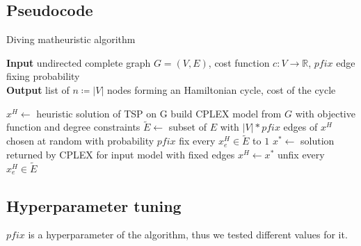 \subsection{Pseudocode}
\begin{algorithm}[h]
    \caption{Diving matheuristic algorithm}
    \hspace*{\algorithmicindent} \textbf{Input} undirected complete graph $G=(V,E)$, cost function $c:V\rightarrow\mathbb{R}$, $pfix$ edge fixing probability\\
    \hspace*{\algorithmicindent} \textbf{Output} list of $n\coloneq|V|$ nodes forming an Hamiltonian cycle, cost of the cycle\\
    \begin{algorithmic}

        \State $x^H \gets$ heuristic solution of TSP on G
        \State build CPLEX model from $G$ with objective function and degree constraints
        \State $\tilde{E} \gets$ subset of $E$ with $|V|*pfix$ edges of $x^H$ chosen at random with probability $pfix$
        \State fix every $x_e^H\in\tilde{E}$ to $1$
        \State $x^*\gets$ solution returned by CPLEX for input model with fixed edges
        \State $x^H\gets x^*$
        \EndIf
        \State unfix every $x_e^H\in\tilde{E}$
        \EndWhile

    \end{algorithmic}
\end{algorithm}
\FloatBarrier

\subsection{Hyperparameter tuning}

$pfix$ is a hyperparameter of the algorithm, thus we tested different values for it.

